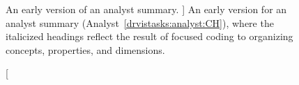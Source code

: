 \begin{figure}
    \centering
    \caption
    [
        An early version of an analyst summary.
    ]
    {
        An early version for an analyst summary (Analyst~\ref{drvistasks:analyst:CH}), where the italicized headings reflect the result of focused coding to organizing concepts, properties, and dimensions. 
    }
    \label{fig:chsum}
    \centering
\end{figure}



